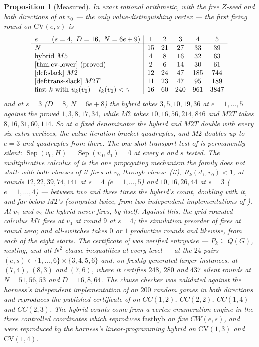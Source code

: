 \documentclass[11pt]{article}
\theoremstyle{plain}
\newtheorem{proposition}[theorem]{Proposition}
\theoremstyle{definition}
\begin{document}
\begin{proposition}[Measured]\label{prop:cv-measured}
In exact rational arithmetic, with the free $Z$-seed and both directions of
 at $v_0$ --- the only value-distinguishing vertex ---
the first firing round on $\mathrm{CV}(e,s)$ is
\[
 \begin{array}{l|ccccc}
   e\qquad (s=4,\ D=16,\ N=6e+9) & 1&2&3&4&5\\\hline
   N                             & 15&21&27&33&39\\
   \text{hybrid }M5              & 4&8&16&32&63\\
   \Cref{thm:cv-lower}\ \text{(proved)} & 2&6&14&30&61\\
   \Cref{def:slack}\ M2          & 12&24&47&185&744\\
   \Cref{def:trans-slack}\ M2T   & 11&23&47&95&189\\
   \text{first }k\text{ with }u_k(v_0)-l_k(v_0)<\gamma & 16&60&240&961&3847
 \end{array}
\]
and at $s=3$ ($D=8$, $N=6e+8$) the hybrid takes $3,5,10,19,36$ at
$e=1,\dots,5$ against the proved $1,3,8,17,34$, while $M2$ takes
$10,16,56,214,846$ and $M2T$ takes $8,16,31,60,114$. So at a \emph{fixed}
denominator the hybrid and $M2T$ double with every six extra vertices, the
value-iteration bracket quadruples, and $M2$ doubles up to $e=3$ and
quadruples from there. The one-shot transport test of
 is \emph{permanently} silent:
$\operatorname{Sep}(v_0,H)=\operatorname{Sep}(v_0,d_1)=0$ at every $e$ and $s$
tested. The multiplicative calculus of  is the one
propagating mechanism the family does not stall: with both clauses of
 it fires at $v_0$ through clause~(ii),
$R_k(d_1,v_0)<1$, at rounds $12,22,39,74,141$ at $s=4$ ($e=1,\dots,5$)
and $10,16,26,44$ at $s=3$ ($e=1,\dots,4$) --- between two and three times
the hybrid's count, doubling with it, and far below $M2$'s
(computed twice, from two independent implementations of ).
At $v_1$ and $v_2$ the hybrid never fires, by  itself.
Against this, the
grid-rounded calculus $M7$ fires at $v_0$ at round $9$ at $s=4$; the simulation
preorder of  fires at round zero; and all-switches takes $0$
or $1$ productive rounds and  likewise, from each of the eight
starts. The certificate of  was verified entrywise ---
$P_k\subseteq Q(G)$, nesting, and all $N^{2}$ clause inequalities at every
level --- at the $24$ pairs $(e,s)\in\{1,\dots,6\}\times\{3,4,5,6\}$ and, on
freshly generated larger instances, at $(7,4)$, $(8,3)$ and $(7,6)$, where it
certifies $248$, $280$ and $437$ silent rounds at $N=51,56,53$ and
$D=16,8,64$. The clause checker was validated against the harness's independent
implementation of  on $200$ random games in both directions and
reproduces the published certificate of  on $CC(1,2)$,
$CC(2,2)$, $CC(1,4)$ and $CC(2,3)$. The hybrid counts come from a
vertex-enumeration engine in the three controlled coordinates which reproduces
$\mathrm{fasthyb}$ on five $CW(e,s)$, and were reproduced by the harness's
linear-programming hybrid on $\mathrm{CV}(1,3)$ and $\mathrm{CV}(1,4)$.
\end{proposition}
\end{document}
